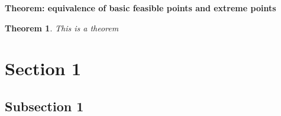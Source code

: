 \documentclass{tufte-handout}
\newenvironment{thm}[1]
{\noindent \textbf{Theorem: #1}\\
	\itshape \noindent}
{\newline}
\newtheorem{theorem}{Theorem}
\begin{document}
	\begin{thm}{equivalence of basic feasible points and extreme points}
	
		
	
	
	
	\begin{theorem}
		This is a theorem
	\end{theorem}
	
	
	\section{Section 1}
	
	
	\subsection{Subsection 1}
\end{document}

